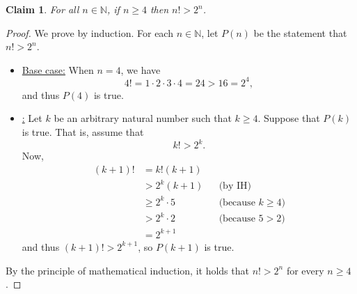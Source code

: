 \documentclass[11pt]{article}
\theoremstyle{plain}
\newtheorem*{claim}{Claim}
\theoremstyle{plain}
\theoremstyle{remark}
\def\naturals{\mathbb{N}}
\begin{document}
\begin{tcolorbox}
\begin{claim}
 For all $n\in\naturals$, if $n\geq 4$ then $n!>2^n$.
\end{claim}
\end{tcolorbox}
\begin{proof}
 We prove by induction. For each $n\in\naturals$,  let  $P(n)$ be the statement that $n!>2^n$. 
 \begin{itemize}
  \item\underline{Base case:} When $n=4$, we have
  \[
   4! = 1\cdot2\cdot3\cdot4 = 24 > 16 = 2^4,
  \]
and thus $P(4)$ is true.
\item\underline{:} Let $k$ be an arbitrary natural number such that $k\geq4$. Suppose that $P(k)$ is true. That is, assume that 
\[
k!>2^k. \tag{IH}
\]
Now, 
\begin{align*}
 (k+1)! &= k!(k+1) \\
 & > 2^k(k+1)&&\text{(by IH)}\\
 & \geq 2^k\cdot 5 &&\text{(because }k\geq4)\\
 & > 2^k\cdot 2 &&\text{(because $5> 2$)}\\
 & = 2^{k+1}
\end{align*}
and thus $(k+1)!>2^{k+1}$, so $P(k+1)$ is true.
 \end{itemize}
By the principle of mathematical induction, it holds that $n!>2^n$ for every $n\geq4$ .
\end{proof}
\end{document}
